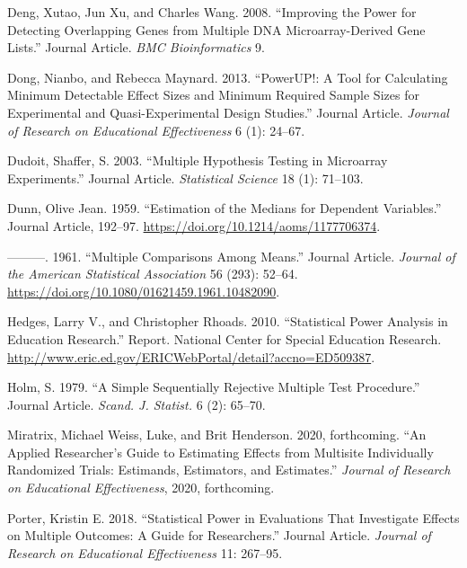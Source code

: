 \documentclass[
]{article}
\newlength{\cslhangindent}
\newlength{\cslentryspacingunit} %
\newenvironment{CSLReferences}[2] %
 {%
  \setlength{\parindent}{0pt}
  \ifodd #1
  \let\oldpar\par
  \def\par{\hangindent=\cslhangindent\oldpar}
  \fi
  \setlength{\parskip}{#2\cslentryspacingunit}
 }%
 {}
\begin{document}
\begin{CSLReferences}{1}{0}
\leavevmode{}%
Deng, Xutao, Jun Xu, and Charles Wang. 2008. {``Improving the Power for
Detecting Overlapping Genes from Multiple DNA Microarray-Derived Gene
Lists.''} Journal Article. \emph{BMC Bioinformatics} 9.

\leavevmode{}%
Dong, Nianbo, and Rebecca Maynard. 2013. {``PowerUP!: A Tool for
Calculating Minimum Detectable Effect Sizes and Minimum Required Sample
Sizes for Experimental and Quasi-Experimental Design Studies.''} Journal
Article. \emph{Journal of Research on Educational Effectiveness} 6 (1):
24--67.

\leavevmode{}%
Dudoit, Shaffer, S. 2003. {``Multiple Hypothesis Testing in Microarray
Experiments.''} Journal Article. \emph{Statistical Science} 18 (1):
71--103.

\leavevmode{}%
Dunn, Olive Jean. 1959. {``Estimation of the Medians for Dependent
Variables.''} Journal Article, 192--97.
\url{https://doi.org/10.1214/aoms/1177706374}.

\leavevmode{}%
---------. 1961. {``Multiple Comparisons Among Means.''} Journal
Article. \emph{Journal of the American Statistical Association} 56
(293): 52--64. \url{https://doi.org/10.1080/01621459.1961.10482090}.

\leavevmode{}%
Hedges, Larry V., and Christopher Rhoads. 2010. {``Statistical Power
Analysis in Education Research.''} Report. National Center for Special
Education Research.
\url{http://www.eric.ed.gov/ERICWebPortal/detail?accno=ED509387}.

\leavevmode{}%
Holm, S. 1979. {``A Simple Sequentially Rejective Multiple Test
Procedure.''} Journal Article. \emph{Scand. J. Statist.} 6 (2): 65--70.

\leavevmode{}%
Miratrix, Michael Weiss, Luke, and Brit Henderson. 2020, forthcoming.
{``An Applied Researcher's Guide to Estimating Effects from Multisite
Individually Randomized Trials: Estimands, Estimators, and Estimates.''}
\emph{Journal of Research on Educational Effectiveness}, 2020,
forthcoming.

\leavevmode{}%
Porter, Kristin E. 2018. {``Statistical Power in Evaluations That
Investigate Effects on Multiple Outcomes: A Guide for Researchers.''}
Journal Article. \emph{Journal of Research on Educational Effectiveness}
11: 267--95.


\end{CSLReferences}
\end{document}
